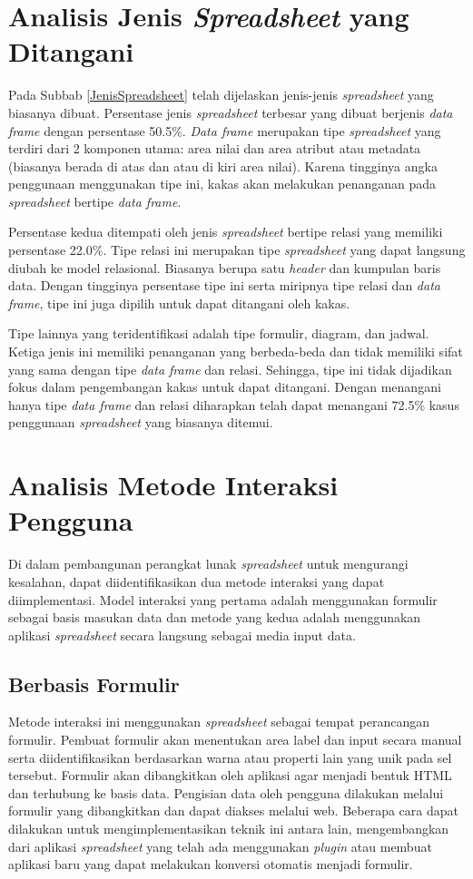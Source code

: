 \section{Analisis Jenis \textit{Spreadsheet} yang Ditangani}
Pada Subbab \ref{JenisSpreadsheet} telah dijelaskan jenis-jenis \textit{spreadsheet} yang biasanya dibuat. Persentase jenis \textit{spreadsheet} terbesar yang dibuat berjenis \textit{data frame} dengan persentase 50.5\%. \textit{Data frame} merupakan tipe \textit{spreadsheet} yang terdiri dari 2 komponen utama: area nilai dan area atribut atau metadata (biasanya berada di atas dan atau di kiri area nilai). Karena tingginya angka penggunaan menggunakan tipe ini, kakas akan melakukan penanganan pada \textit{spreadsheet} bertipe \textit{data frame}.

Persentase kedua ditempati oleh jenis \textit{spreadsheet} bertipe relasi yang memiliki persentase 22.0\%. Tipe relasi ini merupakan tipe \textit{spreadsheet} yang dapat langsung diubah ke model relasional. Biasanya berupa satu \textit{header} dan kumpulan baris data. Dengan tingginya persentase tipe ini serta miripnya tipe relasi dan \textit{data frame}, tipe ini juga dipilih untuk dapat ditangani oleh kakas.

Tipe lainnya yang teridentifikasi adalah tipe formulir, diagram, dan jadwal. Ketiga jenis ini memiliki penanganan yang berbeda-beda dan tidak memiliki sifat yang sama dengan tipe \textit{data frame} dan relasi. Sehingga, tipe ini tidak dijadikan fokus dalam pengembangan kakas untuk dapat ditangani. Dengan menangani hanya tipe \textit{data frame} dan relasi diharapkan telah dapat menangani 72.5\% kasus penggunaan \textit{spreadsheet} yang biasanya ditemui.

\section{Analisis Metode Interaksi Pengguna}
Di dalam pembangunan perangkat lunak \textit{spreadsheet} untuk mengurangi kesalahan, dapat diidentifikasikan dua metode interaksi yang dapat diimplementasi. Model interaksi yang pertama adalah menggunakan formulir sebagai basis masukan data dan metode yang kedua adalah menggunakan aplikasi \textit{spreadsheet} secara langsung sebagai media input data.
	\subsection{Berbasis Formulir}
	Metode interaksi ini menggunakan \textit{spreadsheet} sebagai tempat perancangan formulir. Pembuat formulir akan menentukan area label dan input secara manual serta diidentifikasikan berdasarkan warna atau properti lain yang unik pada sel tersebut. Formulir akan dibangkitkan oleh aplikasi agar menjadi bentuk HTML dan terhubung ke basis data. Pengisian data oleh pengguna dilakukan melalui formulir yang dibangkitkan dan dapat diakses melalui web. Beberapa cara dapat dilakukan untuk mengimplementasikan teknik ini antara lain, mengembangkan dari aplikasi \textit{spreadsheet} yang telah ada menggunakan \textit{plugin} atau membuat aplikasi baru yang dapat melakukan konversi otomatis menjadi formulir.

